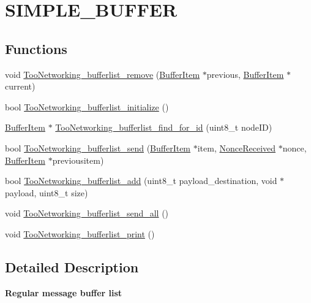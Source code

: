 \hypertarget{group__SIMPLE__BUFFER}{}\section{S\+I\+M\+P\+L\+E\+\_\+\+B\+U\+F\+F\+ER}
\label{group__SIMPLE__BUFFER}
\subsection*{Functions}
\begin{DoxyCompactItemize}
\item 
void \hyperlink{group__SIMPLE__BUFFER_ga3c91b7ab2f6500c287ecc7ab4a018ef6}{Too\+Networking\+\_\+bufferlist\+\_\+remove} (\hyperlink{structBufferItem}{Buffer\+Item} $\ast$previous, \hyperlink{structBufferItem}{Buffer\+Item} $\ast$current)
\item 
bool \hyperlink{group__SIMPLE__BUFFER_gaa8a4e879d4d71fed2a8940cf93b75ae4}{Too\+Networking\+\_\+bufferlist\+\_\+initialize} ()
\item 
\hyperlink{structBufferItem}{Buffer\+Item} $\ast$ \hyperlink{group__SIMPLE__BUFFER_ga0dd5e9de81eea99b99669a607c9b4028}{Too\+Networking\+\_\+bufferlist\+\_\+find\+\_\+for\+\_\+id} (uint8\+\_\+t node\+ID)
\item 
bool \hyperlink{group__SIMPLE__BUFFER_gae72372a8084e8486f1306240a9af6474}{Too\+Networking\+\_\+bufferlist\+\_\+send} (\hyperlink{structBufferItem}{Buffer\+Item} $\ast$item, \hyperlink{structNonceReceived}{Nonce\+Received} $\ast$nonce, \hyperlink{structBufferItem}{Buffer\+Item} $\ast$previousitem)
\item 
bool \hyperlink{group__SIMPLE__BUFFER_ga1fca7e85a8a2f91a1b20a8bb23b4e893}{Too\+Networking\+\_\+bufferlist\+\_\+add} (uint8\+\_\+t payload\+\_\+destination, void $\ast$payload, uint8\+\_\+t size)
\item 
void \hyperlink{group__SIMPLE__BUFFER_gab58e06e0eb6f2f8ecbebeaf3c173fb22}{Too\+Networking\+\_\+bufferlist\+\_\+send\+\_\+all} ()
\item 
void \hyperlink{group__SIMPLE__BUFFER_ga2b5485b317146ce7c14bbad26172d796}{Too\+Networking\+\_\+bufferlist\+\_\+print} ()
\end{DoxyCompactItemize}


\subsection{Detailed Description}
{\bfseries Regular message buffer list} 

